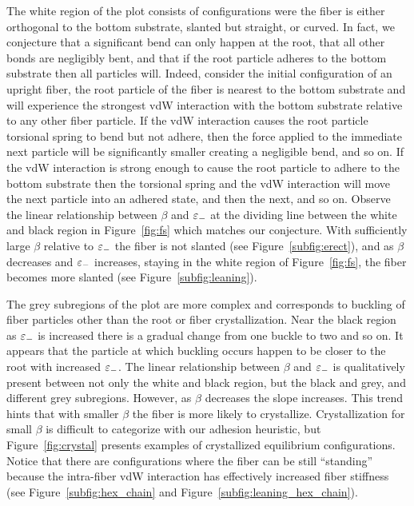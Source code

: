 The white region of the plot consists of configurations were the fiber is either orthogonal to the bottom substrate, slanted but straight, or curved.
In fact, we conjecture that a significant bend can only happen at the root, that all other bonds are negligibly bent, and that if the root particle adheres to the bottom substrate then all particles will.
Indeed, consider the initial configuration of an upright fiber, the root particle of the fiber is nearest to the bottom substrate and will experience the strongest vdW interaction with the bottom substrate relative to any other fiber particle.
If the vdW interaction causes the root particle torsional spring to bend but not adhere, then the force applied to the immediate next particle will be significantly smaller creating a negligible bend, and so on.
If the vdW interaction is strong enough to cause the root particle to adhere to the bottom substrate then the torsional spring and the vdW interaction will move the next particle into an adhered state, and then the next, and so on.
Observe the linear relationship between $\beta$ and $\varepsilon_-$ at the dividing line between the white and black region in Figure~\ref{fig:fs} which matches our conjecture.
With sufficiently large $\beta$ relative to $\varepsilon_-$ the fiber is not slanted (see Figure~\ref{subfig:erect}), and as $\beta$ decreases and $\varepsilon_-$ increases, staying in the white region of Figure~\ref{fig:fs}, the fiber becomes more slanted (see Figure~\ref{subfig:leaning}).

The grey subregions of the plot are more complex and corresponds to buckling of fiber particles other than the root or fiber crystallization. Near the black region as $\varepsilon_-$ is increased there is a gradual change from one buckle to two and so on. It appears that the particle at which buckling occurs happen to be closer to the root with increased $\varepsilon_-$. The linear relationship between $\beta$ and $\varepsilon_-$ is qualitatively present between not only the white and black region, but the black and grey, and different grey subregions. However, as $\beta$ decreases the slope increases. This trend hints that with smaller $\beta$ the fiber is more likely to crystallize. Crystallization for small $\beta$ is difficult to categorize with our adhesion heuristic, but Figure~\ref{fig:crystal} presents examples of  crystallized equilibrium configurations. Notice that there are configurations where the fiber can be still ``standing'' because the intra-fiber vdW interaction has effectively increased fiber stiffness (see Figure~\ref{subfig:hex_chain} and Figure~\ref{subfig:leaning_hex_chain}).

